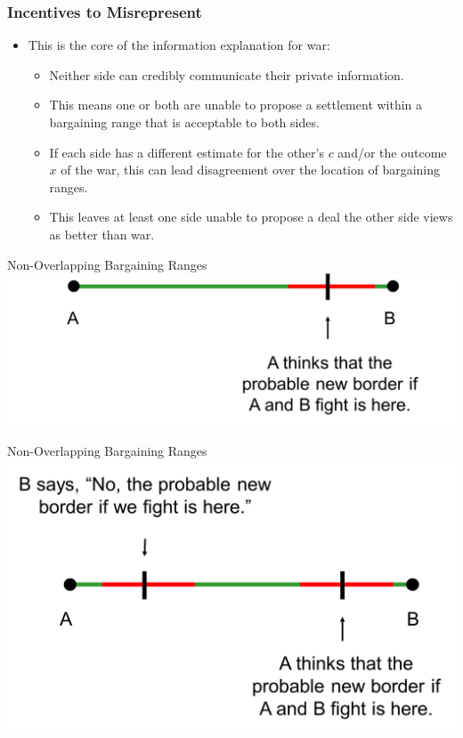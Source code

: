 \documentclass{beamer}
\begin{document}
\begin{frame} 
	\frametitle{\LARGE{Incentives to Misrepresent}}
	\begin{itemize}
		\item This is the core of the information explanation for war: 
		\begin{itemize}
			\item Neither side can credibly communicate their private information.
			\item This means one or both are unable to propose a settlement within a bargaining range that is acceptable to both sides. \pause
			\item If each side has a different estimate for the other's $c$ and/or the outcome $x$ of the war, this can lead disagreement over the location of bargaining ranges. \pause
			\item This leaves at least one side unable to propose a deal the other side views as better than war. 
		\end{itemize}
	\end{itemize}
\end{frame}

\begin{frame}{Non-Overlapping Bargaining Ranges}
	\centering
	\includegraphics[width=\textwidth,height=0.8\textheight,keepaspectratio]{Bluff1.png}
\end{frame}


\begin{frame}{Non-Overlapping Bargaining Ranges}
	\centering
	\includegraphics[width=\textwidth,height=0.8\textheight,keepaspectratio]{Bluff2.png}
\end{frame}
\end{document}
